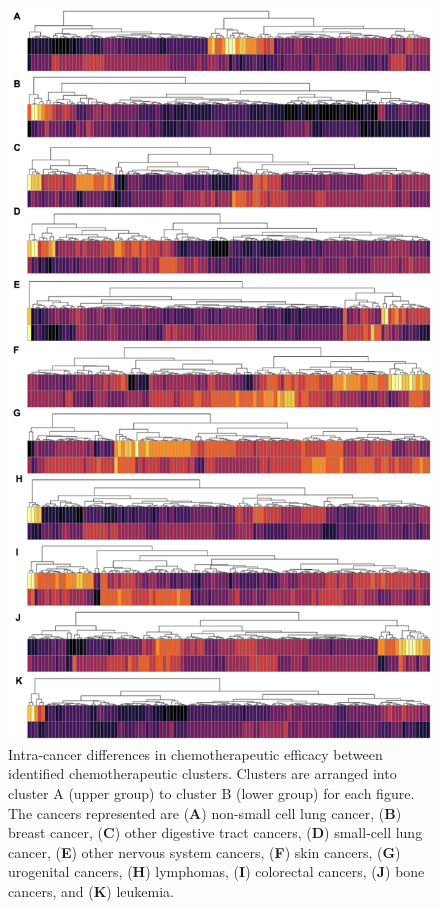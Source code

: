 \documentclass[10pt, letterpaper, twocolumn]{article}
\begin{document}
\begin{figure}[!ht]
	\centering
	\includegraphics[height=0.8\textheight]{Figures/intra.png}

	\caption{Intra-cancer differences in chemotherapeutic efficacy between identified chemotherapeutic clusters. Clusters are arranged into cluster A (upper group) to cluster B (lower group) for each figure. The cancers represented are (\textbf{A}) non-small cell lung cancer, (\textbf{B}) breast cancer, (\textbf{C}) other digestive tract cancers, (\textbf{D}) small-cell lung cancer, (\textbf{E}) other nervous system cancers, (\textbf{F}) skin cancers, (\textbf{G}) urogenital cancers, (\textbf{H}) lymphomas, (\textbf{I}) colorectal cancers, (\textbf{J}) bone cancers, and (\textbf{K}) leukemia.}
	\label{fig:intra}
\end{figure}
\end{document}
